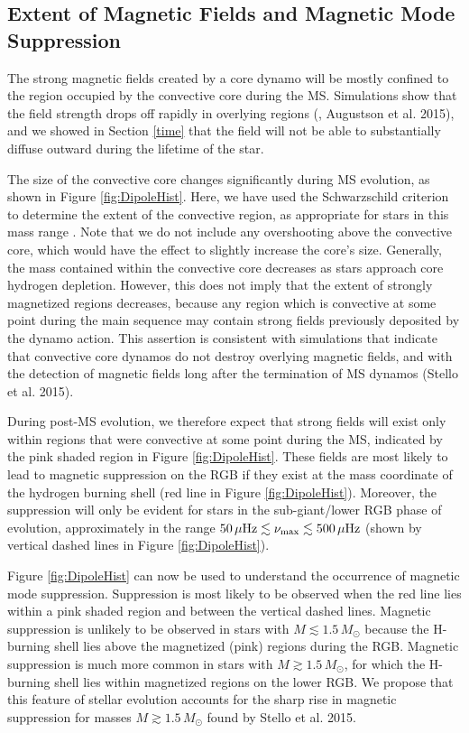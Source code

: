\subsection{Extent of Magnetic Fields and Magnetic Mode Suppression}
\label{rgb}

The strong magnetic fields created by a core dynamo will be mostly confined to the region occupied by the convective core during the MS. Simulations show that the field strength drops off rapidly in overlying regions (\citealt{Featherstone_2009}, Augustson et al. 2015), and we showed in Section \ref{time} that the field will not be able to substantially diffuse outward during the lifetime of the star. 

The size of the convective core changes significantly during MS evolution, as shown in Figure \ref{fig:DipoleHist}. Here, we have used the Schwarzschild criterion to determine the extent of the convective region, as appropriate for stars in this mass range \citep{Moore_2015}. Note that we do not include any  overshooting above the convective core, which would have the effect to slightly increase the core's size. Generally, the mass contained within the convective core decreases as stars approach core hydrogen depletion. However, this does not imply that the extent of strongly magnetized regions decreases, because any region which is convective at some point during the main sequence may contain strong fields previously deposited by the dynamo action. This assertion is consistent with simulations \citep{Featherstone_2009} that indicate that convective core dynamos do not destroy overlying magnetic fields, and with the detection of magnetic fields long after the termination of MS dynamos (Stello et al. 2015).

During post-MS evolution, we therefore expect that strong fields will exist only within regions that were convective at some point during the MS, indicated by the pink shaded region in Figure \ref{fig:DipoleHist}. These fields are most likely to lead to magnetic suppression on the RGB if they exist at the mass coordinate of the hydrogen burning shell (red line in Figure \ref{fig:DipoleHist}). Moreover, the suppression will only be evident for stars in the sub-giant/lower RGB phase of evolution, approximately in the range $50 \, \mu {\rm Hz} \lesssim \nu_{\rm max} \lesssim 500 \, \mu {\rm Hz}$ (shown by vertical dashed lines in Figure \ref{fig:DipoleHist}).

Figure \ref{fig:DipoleHist} can now be used to understand the occurrence of magnetic mode suppression. Suppression is most likely to be observed when the red line lies within a pink shaded region and between the vertical dashed lines. Magnetic suppression is unlikely to be observed in stars with $M \lesssim 1.5 \, M_\odot$ because the H-burning shell lies above the magnetized (pink) regions during the RGB. Magnetic suppression is much more common in stars with $M \gtrsim 1.5 \, M_\odot$, for which the H-burning shell lies within magnetized regions on the lower RGB. We propose that this feature of stellar evolution accounts for the sharp rise in magnetic suppression for masses $M \gtrsim 1.5 \, M_\odot$ found by Stello et al. 2015.

    
    
  
  